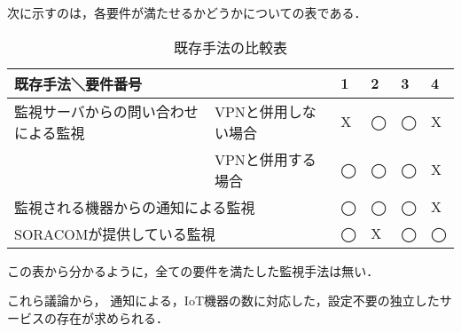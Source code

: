 	次に示すのは，各要件が満たせるかどうかについての表である．\\
	\begin{table}[htbp]
	\caption{既存手法の比較表}
	\begin{tabular}{|l|l|l|l|l|l|} \hline
		\multicolumn{2}{|l|}{既存手法＼要件番号} & 
		\multicolumn{1}{|l|}{1} &
		\multicolumn{1}{|l|}{2} &
		\multicolumn{1}{|l|}{3} &
		\multicolumn{1}{|l|}{4} \\ \hline \hline
		監視サーバからの問い合わせによる監視 & VPNと併用しない場合 & X & ◯ & ◯ & X  \\ \cline{2-6}
			& VPNと併用する場合 & ◯ & ◯ & ◯ & X \\ \hline
		\multicolumn{2}{|l|}{監視される機器からの通知による監視} & ◯ & ◯ & ◯ & X \\ \hline
		\multicolumn{2}{|l|}{SORACOMが提供している監視} & ◯ & X & ◯ & ◯ \\ \hline
	\end{tabular}
	\end{table}
	この表から分かるように，全ての要件を満たした監視手法は無い．
	
	これら議論から，
	通知による，IoT機器の数に対応した，設定不要の独立したサービスの存在が求められる．

